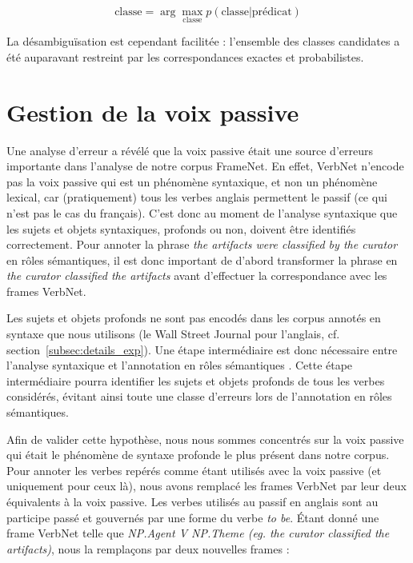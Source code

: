 $$ \text{classe} = \arg\max_{\text{classe}} p(\text{classe} \vert \text{prédicat}) $$

La désambiguïsation est cependant facilitée : l'ensemble des classes candidates
a été auparavant restreint par les correspondances exactes et probabilistes.

\section{Gestion de la voix passive}
\label{sec:passif}

Une analyse d'erreur a révélé que la voix passive était une source d'erreurs
importante dans l'analyse de notre corpus FrameNet. En effet, VerbNet n'encode
pas la voix passive qui est un phénomène syntaxique, et non un phénomène
lexical, car (pratiquement) tous les verbes anglais permettent le passif (ce
qui n'est pas le cas du français). C'est donc au moment de l'analyse syntaxique
que les sujets et objets syntaxiques, profonds ou non, doivent être identifiés
correctement. Pour annoter la phrase \textit{the artifacts were classified by the
curator} en rôles sémantiques, il est donc important de d'abord transformer la
phrase en \textit{the curator classified the artifacts} avant d'effectuer la
correspondance avec les frames VerbNet.

Les sujets et objets profonds ne sont pas encodés dans les corpus annotés en
syntaxe que nous utilisons (le Wall Street Journal pour l'anglais, cf.
section~\ref{subsec:details_exp}). Une étape intermédiaire est donc nécessaire
entre l'analyse syntaxique et l'annotation en rôles sémantiques
\citep{bonfante2011modular, ribeyre2013systeme}. Cette étape intermédiaire
pourra identifier les sujets et objets profonds de tous les verbes considérés,
évitant ainsi toute une classe d'erreurs lors de l'annotation en rôles
sémantiques. 

Afin de valider cette hypothèse, nous nous sommes concentrés sur la voix
passive qui était le phénomène de syntaxe profonde le plus présent dans notre
corpus.  Pour annoter les verbes repérés comme étant utilisés avec la voix
passive (et uniquement pour ceux là), nous avons remplacé les frames VerbNet
par leur deux équivalents à la voix passive. Les verbes utilisés au passif en
anglais sont au participe passé et gouvernés par une forme du verbe \textit{to
be}. Étant donné une frame VerbNet telle que \textit{NP.Agent V NP.Theme (eg.
the curator classified the artifacts)}, nous la remplaçons par deux nouvelles
frames :

